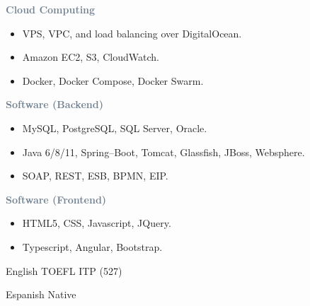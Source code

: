 




\textcolor{SlateGrey}{\textbf{Cloud Computing}}
\newline

\begin{itemize}
    \item VPS, VPC, and load balancing over DigitalOcean.
    \item Amazon EC2, S3, CloudWatch.
    \item Docker, Docker Compose, Docker Swarm.
\end{itemize}

\textcolor{SlateGrey}{\textbf{Software (Backend)}}
\newline

\begin{itemize}
    \item MySQL, PostgreSQL, SQL Server, Oracle.
    \item Java 6/8/11, Spring--Boot, Tomcat, Glassfish, JBoss, Websphere.
    \item SOAP, REST, ESB, BPMN, EIP.
\end{itemize}

\textcolor{SlateGrey}{\textbf{Software (Frontend)}}
\newline

\begin{itemize}
    \item HTML5, CSS, Javascript, JQuery.
    \item Typescript, Angular, Bootstrap.
\end{itemize}


English \hfill TOEFL ITP (527) 

\divider

Espanish \hfill Native 





